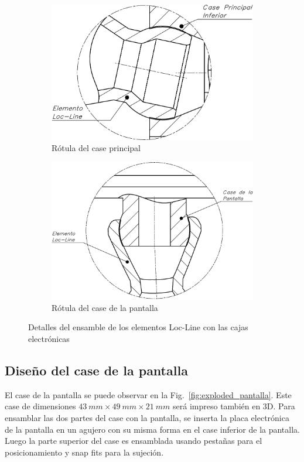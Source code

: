 \begin{figure}[hbt!]
\centering
\begin{subfigure}{.5\textwidth}
  \centering
  \includegraphics[width=0.9\linewidth]{rotula_principal.pdf}
  \caption{Rótula del case principal}
  \label{fig:rotula_principal}
\end{subfigure}%
\begin{subfigure}{.5\textwidth}
  \centering
  \includegraphics[width=0.97\linewidth]{rotula_pantalla.pdf}
  \caption{Rótula del case de la pantalla}
  \label{fig:rotula_pantalla}
\end{subfigure}
\caption{Detalles del ensamble de los elementos Loc-Line con las cajas electrónicas}
\label{fig:rotulas}
\end{figure}


\subsection{Diseño del case de la pantalla}
El case de la pantalla se puede observar en la Fig.~\ref{fig:exploded_pantalla}. Este case de dimensiones $\SI{43}{mm} \times \SI{49}{mm} \times \SI{21}{mm}$ será impreso también en 3D. Para ensamblar las dos partes del case con la pantalla, se inserta la placa electrónica de la pantalla en un agujero con su misma forma en el case inferior de la pantalla. Luego la parte superior del case es ensamblada usando pestañas para el posicionamiento y snap fits para la sujeción.

